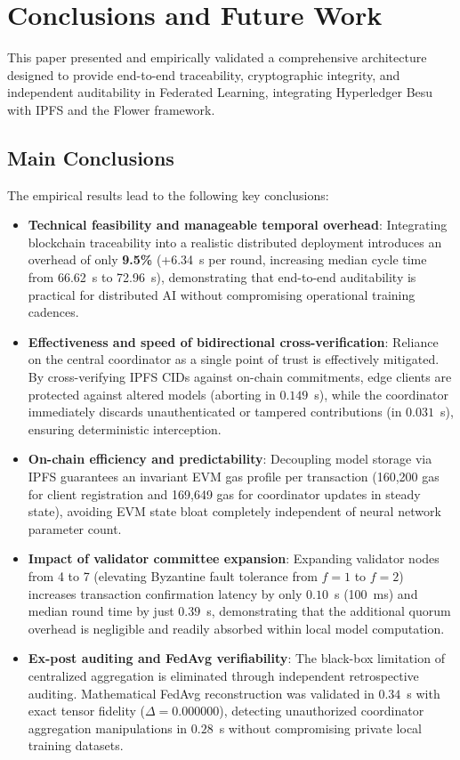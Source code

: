 \section{Conclusions and Future Work}
\label{sec:conclusiones}

This paper presented and empirically validated a comprehensive architecture designed to provide end-to-end traceability, cryptographic integrity, and independent auditability in Federated Learning, integrating Hyperledger Besu with IPFS and the Flower framework.

\subsection{Main Conclusions}
The empirical results lead to the following key conclusions:
\begin{itemize}
    \item \textbf{Technical feasibility and manageable temporal overhead}: Integrating blockchain traceability into a realistic distributed deployment introduces an overhead of only \textbf{9.5\%} (+6.34~s per round, increasing median cycle time from 66.62~s to 72.96~s), demonstrating that end-to-end auditability is practical for distributed AI without compromising operational training cadences.
    \item \textbf{Effectiveness and speed of bidirectional cross-verification}: Reliance on the central coordinator as a single point of trust is effectively mitigated. By cross-verifying IPFS CIDs against on-chain commitments, edge clients are protected against altered models (aborting in $0.149$~s), while the coordinator immediately discards unauthenticated or tampered contributions (in $0.031$~s), ensuring deterministic interception.
    \item \textbf{On-chain efficiency and predictability}: Decoupling model storage via IPFS guarantees an invariant EVM gas profile per transaction (160,200 gas for client registration and 169,649 gas for coordinator updates in steady state), avoiding EVM state bloat completely independent of neural network parameter count.
    \item \textbf{Impact of validator committee expansion}: Expanding validator nodes from 4 to 7 (elevating Byzantine fault tolerance from $f=1$ to $f=2$) increases transaction confirmation latency by only $0.10$~s (100~ms) and median round time by just $0.39$~s, demonstrating that the additional quorum overhead is negligible and readily absorbed within local model computation.
    \item \textbf{Ex-post auditing and FedAvg verifiability}: The black-box limitation of centralized aggregation is eliminated through independent retrospective auditing. Mathematical FedAvg reconstruction was validated in $0.34$~s with exact tensor fidelity ($\Delta = 0.000000$), detecting unauthorized coordinator aggregation manipulations in $0.28$~s without compromising private local training datasets.
\end{itemize}

